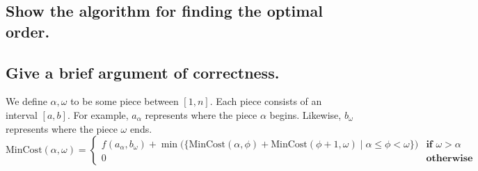 \documentclass[11pt]{scrartcl}
\begin{document}
\begin{algorithm}
\end{algorithm}

\subsection{
	Show the algorithm for finding the optimal order.
}

\subsection{
	Give a brief argument of correctness.
}

We define $\alpha,\omega$ to be some piece between $[1,n]$. Each piece consists of an interval $[a,b]$.
For example, $a_\alpha$ represents where the piece $\alpha$ begins. 
Likewise, $b_\omega$ represents where the piece $\omega$ ends.
\[
	\text{MinCost}(\alpha,\omega)=
	\begin{cases}
		f(a_\alpha,b_\omega) + \min\Big(  
		\Big\{\text{MinCost}(\alpha, \phi) + \text{MinCost}(\phi + 1, \omega) \mid \alpha \leq \phi < \omega\Big\} \Big)
		& \textbf{if } \omega > \alpha \\
		0 & \textbf{otherwise}
	\end{cases}
\]
\end{document}
